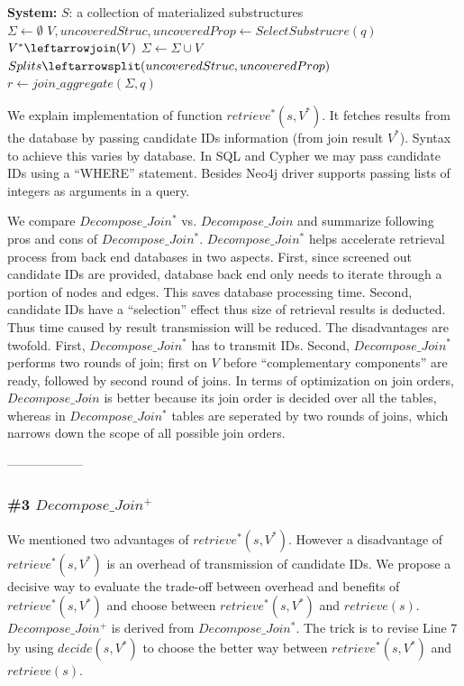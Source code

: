 \begin{algorithm}[H]
\caption{$Decompose\_Join^{*}$}
\LinesNumbered
\textbf{System:} $S$: a collection of materialized substructures\\
$\Sigma \gets \emptyset $\;
$V, uncoveredStruc, uncoveredProp \gets SelectSubstrucre(q) $\;
$V^{*}\leftarrowjoin(V)$\;
$\Sigma \gets \Sigma \cup V $\;
$Splits\leftarrowsplit(uncoveredStruc, uncoveredProp)$\;
$r \leftarrow join\_aggregate(\Sigma, q)$\;
\end{algorithm}


We explain implementation of function $retrieve^{*}(s, V^{*})$. It fetches results from the database by passing candidate IDs information (from join result $V^{*}$). Syntax to achieve this varies by database. In SQL and Cypher we may pass candidate IDs using a ``WHERE'' statement. Besides Neo4j driver supports passing lists of integers as arguments in a query.


We compare $Decompose\_Join^{*}$ vs.  $Decompose\_Join$ and summarize following pros and cons of $Decompose\_Join^{*}$. $Decompose\_Join^{*}$ helps accelerate retrieval process from back end databases in two aspects. First, since screened out candidate IDs are provided, database back end only needs to iterate through a portion of nodes and edges. This saves database processing time. Second, candidate IDs have a ``selection'' effect thus size of retrieval results is deducted. Thus time caused by result transmission will be reduced. The disadvantages are twofold. First, $Decompose\_Join^{*}$ has to transmit IDs. Second,  $Decompose\_Join^{*}$ performs two rounds of join; first on $V$ before ``complementary components'' are ready,  followed by second round of joins. In terms of optimization on join orders, $Decompose\_Join$ is better because its join order is decided over all the tables, whereas in $Decompose\_Join^{*}$ tables are seperated by two rounds of joins, which narrows down the scope of all possible join orders.

------------------
\subsubsection{\#3 $Decompose\_Join^{+}$}
We mentioned two advantages of $retrieve^{*}(s, V^{*})$. However a disadvantage of $retrieve^{*}(s, V^{*})$ is an overhead of transmission of candidate IDs. We propose a decisive way to evaluate the trade-off between overhead and benefits of $retrieve^{*}(s, V^{*})$ and choose between $retrieve^{*}(s, V^{*})$ and $retrieve(s)$. $Decompose\_Join^{+}$ is derived from $Decompose\_Join^{*}$. The trick is to revise Line 7 by using $decide(s,V^{*})$ to choose the better way between $retrieve^{*}(s, V^{*})$ and $retrieve(s)$.

